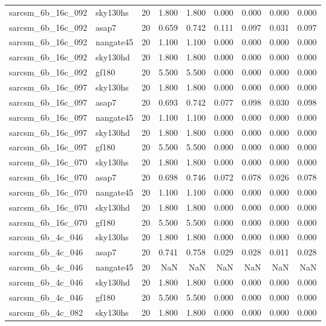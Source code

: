 \begin{tabular}{llrrrrrrr}
sarcsm\_6b\_16c\_092 & sky130hs & 20 & 1.800 & 1.800 & 0.000 & 0.000 & 0.000 & 0.000 \\
sarcsm\_6b\_16c\_092 & asap7 & 20 & 0.659 & 0.742 & 0.111 & 0.097 & 0.031 & 0.097 \\
sarcsm\_6b\_16c\_092 & nangate45 & 20 & 1.100 & 1.100 & 0.000 & 0.000 & 0.000 & 0.000 \\
sarcsm\_6b\_16c\_092 & sky130hd & 20 & 1.800 & 1.800 & 0.000 & 0.000 & 0.000 & 0.000 \\
sarcsm\_6b\_16c\_092 & gf180 & 20 & 5.500 & 5.500 & 0.000 & 0.000 & 0.000 & 0.000 \\
sarcsm\_6b\_16c\_097 & sky130hs & 20 & 1.800 & 1.800 & 0.000 & 0.000 & 0.000 & 0.000 \\
sarcsm\_6b\_16c\_097 & asap7 & 20 & 0.693 & 0.742 & 0.077 & 0.098 & 0.030 & 0.098 \\
sarcsm\_6b\_16c\_097 & nangate45 & 20 & 1.100 & 1.100 & 0.000 & 0.000 & 0.000 & 0.000 \\
sarcsm\_6b\_16c\_097 & sky130hd & 20 & 1.800 & 1.800 & 0.000 & 0.000 & 0.000 & 0.000 \\
sarcsm\_6b\_16c\_097 & gf180 & 20 & 5.500 & 5.500 & 0.000 & 0.000 & 0.000 & 0.000 \\
sarcsm\_6b\_16c\_070 & sky130hs & 20 & 1.800 & 1.800 & 0.000 & 0.000 & 0.000 & 0.000 \\
sarcsm\_6b\_16c\_070 & asap7 & 20 & 0.698 & 0.746 & 0.072 & 0.078 & 0.026 & 0.078 \\
sarcsm\_6b\_16c\_070 & nangate45 & 20 & 1.100 & 1.100 & 0.000 & 0.000 & 0.000 & 0.000 \\
sarcsm\_6b\_16c\_070 & sky130hd & 20 & 1.800 & 1.800 & 0.000 & 0.000 & 0.000 & 0.000 \\
sarcsm\_6b\_16c\_070 & gf180 & 20 & 5.500 & 5.500 & 0.000 & 0.000 & 0.000 & 0.000 \\
sarcsm\_6b\_4c\_046 & sky130hs & 20 & 1.800 & 1.800 & 0.000 & 0.000 & 0.000 & 0.000 \\
sarcsm\_6b\_4c\_046 & asap7 & 20 & 0.741 & 0.758 & 0.029 & 0.028 & 0.011 & 0.028 \\
sarcsm\_6b\_4c\_046 & nangate45 & 20 & NaN & NaN & NaN & NaN & NaN & NaN \\
sarcsm\_6b\_4c\_046 & sky130hd & 20 & 1.800 & 1.800 & 0.000 & 0.000 & 0.000 & 0.000 \\
sarcsm\_6b\_4c\_046 & gf180 & 20 & 5.500 & 5.500 & 0.000 & 0.000 & 0.000 & 0.000 \\
sarcsm\_6b\_4c\_082 & sky130hs & 20 & 1.800 & 1.800 & 0.000 & 0.000 & 0.000 & 0.000 \\

\end{tabular}
